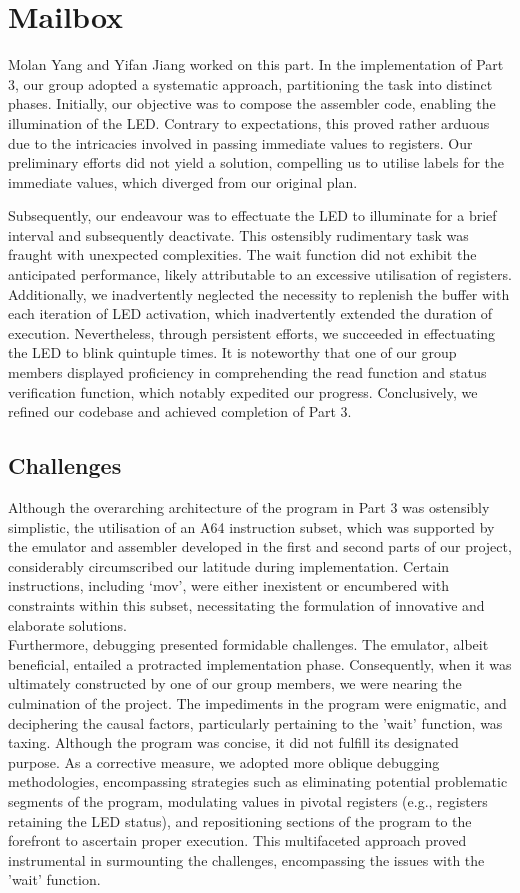 \documentclass[11pt]{article}
\begin{document}
\section{Mailbox}
Molan Yang and Yifan Jiang worked on this part. In the implementation of Part 3, our group adopted a systematic approach, partitioning the task into distinct phases. Initially, our objective was to compose the assembler code, enabling the illumination of the LED. Contrary to expectations, this proved rather arduous due to the intricacies involved in passing immediate values to registers. Our preliminary efforts did not yield a solution, compelling us to utilise labels for the immediate values, which diverged from our original plan.

Subsequently, our endeavour was to effectuate the LED to illuminate for a brief interval and subsequently deactivate. This ostensibly rudimentary task was fraught with unexpected complexities. The wait function did not exhibit the anticipated performance, likely attributable to an excessive utilisation of registers. Additionally, we inadvertently neglected the necessity to replenish the buffer with each iteration of LED activation, which inadvertently extended the duration of execution. Nevertheless, through persistent efforts, we succeeded in effectuating the LED to blink quintuple times. It is noteworthy that one of our group members displayed proficiency in comprehending the read function and status verification function, which notably expedited our progress. Conclusively, we refined our codebase and achieved completion of Part 3.

\subsection{Challenges}
Although the overarching architecture of the program in Part 3 was ostensibly simplistic, the utilisation of an A64 instruction subset, which was supported by the emulator and assembler developed in the first and second parts of our project, considerably circumscribed our latitude during implementation. Certain instructions, including ‘mov’, were either inexistent or encumbered with constraints within this subset, necessitating the formulation of innovative and elaborate solutions. \\

Furthermore, debugging presented formidable challenges. The emulator, albeit beneficial, entailed a protracted implementation phase. Consequently, when it was ultimately constructed by one of our group members, we were nearing the culmination of the project. The impediments in the program were enigmatic, and deciphering the causal factors, particularly pertaining to the 'wait' function, was taxing. Although the program was concise, it did not fulfill its designated purpose. As a corrective measure, we adopted more oblique debugging methodologies, encompassing strategies such as eliminating potential problematic segments of the program, modulating values in pivotal registers (e.g., registers retaining the LED status), and repositioning sections of the program to the forefront to ascertain proper execution. This multifaceted approach proved instrumental in surmounting the challenges, encompassing the issues with the 'wait' function.
\end{document}
